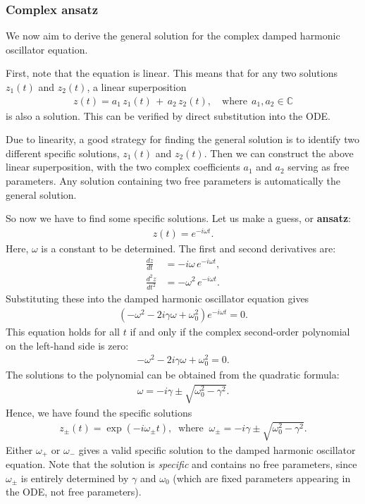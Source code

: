 \documentclass[10pt,a4paper]{article}
\begin{document}
\subsubsection{Complex ansatz}
\label{complex-ansatz}

We now aim to derive the general solution for the complex damped
harmonic oscillator equation.

First, note that the equation is linear. This means that for any two
solutions $z_1(t)$ and $z_2(t)$, a linear superposition
\begin{align}
  z(t) = a_1 \, z_1(t) \,+\, a_2 \,z_2(t),\quad \mathrm{where}\;\,
  a_1, a_2 \in \mathbb{C}
\end{align}
is also a solution. This can be verified by direct substitution into the ODE.

Due to linearity, a good strategy for finding the general solution is
to identify two different specific solutions, $z_1(t)$ and
$z_2(t)$. Then we can construct the above linear superposition, with
the two complex coefficients $a_1$ and $a_2$ serving as free
parameters. Any solution containing two free parameters is
automatically the general solution.

So now we have to find some specific solutions. Let us make a guess,
or \textbf{ansatz}:
\begin{align}
  z(t) = e^{-i\omega t}.
\end{align}
Here, $\omega$ is a constant to be determined.  The first and second
derivatives are:
\begin{align}
  \frac{dz}{dt} &= -i\omega\, e^{-i\omega t}, \\
  \frac{d^2z}{dt^2} &= -\omega^2\, e^{-i\omega t}.
\end{align}
Substituting these into the damped harmonic oscillator equation gives
\begin{align}
  \left(-\omega^2 - 2i\gamma \omega + \omega_0^2 \right) e^{-i\omega t} = 0.
\end{align}
This equation holds for all $t$ if and only if the complex
second-order polynomial on the left-hand side is zero:
\begin{align}
  -\omega^2 - 2i\gamma \omega + \omega_0^2 = 0.
\end{align}
The solutions to the polynomial can be obtained from the quadratic
formula:
\begin{align}
  \omega = -i\gamma \pm \sqrt{\omega_0^2 - \gamma^2}.
\end{align}
Hence, we have found the specific solutions
\begin{align}
  z_\pm(t) = \exp\left(-i\omega_\pm t\right),
  \;\;\mathrm{where}\;\;
  \omega_\pm = -i\gamma \pm \sqrt{\omega_0^2 - \gamma^2}.
\end{align}
Either $\omega_+$ or $\omega_-$ gives a valid specific solution to the
damped harmonic oscillator equation. Note that the solution is
\textit{specific} and contains no free parameters, since $\omega_\pm$
is entirely determined by $\gamma$ and $\omega_0$ (which are fixed
parameters appearing in the ODE, not free parameters).
\end{document}
